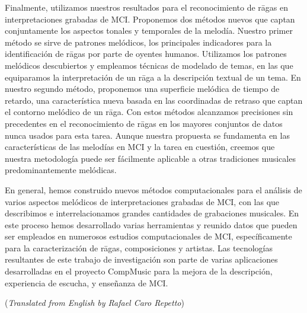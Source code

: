 Finalmente, utilizamos nuestros resultados para el reconocimiento de rāgas en interpretaciones grabadas de MCI. Proponemos dos métodos nuevos que captan conjuntamente los aspectos tonales y temporales de la melodía. Nuestro primer método se sirve de patrones melódicos, los principales indicadores para la identificación de rāgas por parte de oyentes humanos. Utilizamos los patrones melódicos descubiertos y empleamos técnicas de modelado de temas, en las que equiparamos la interpretación de un rāga a la descripción textual de un tema. En nuestro segundo método, proponemos una superficie melódica de tiempo de retardo, una característica nueva basada en las coordinadas de retraso que captan el contorno melódico de un rāga. Con estos métodos alcanzamos precisiones sin precedentes en el reconocimiento de rāgas en los mayores conjuntos de datos nunca usados para esta tarea. Aunque nuestra propuesta se fundamenta en las características de las melodías en MCI y la tarea en cuestión, creemos que nuestra metodología puede ser fácilmente aplicable a otras tradiciones musicales predominantemente melódicas.

En general, hemos construido nuevos métodos computacionales para el análisis de varios aspectos melódicos de interpretaciones grabadas de MCI, con las que describimos e interrelacionamos grandes cantidades de grabaciones musicales. En este proceso hemos desarrollado varias herramientas y reunido datos que pueden ser empleados en numerosos estudios computacionales de MCI, específicamente para la caracterización de rāgas, composiciones y artistas. Las tecnologías resultantes de este trabajo de investigación son parte de varias aplicaciones desarrolladas en el proyecto CompMusic para la mejora de la descripción, experiencia de escucha, y enseñanza de MCI.

\vfill
{\small \noindent (\emph{Translated from English by Rafael Caro Repetto})}